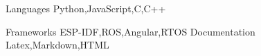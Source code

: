 
\begin{cvskills}
  \cvskill
    {Languages} %
    {Python,JavaScript,C,C++} %

  \cvskill
    {Frameworks} %
    {ESP-IDF,ROS,Angular,RTOS} %
  \cvskill
    {Documentation} %
    {Latex,Markdown,HTML} %
\end{cvskills}
